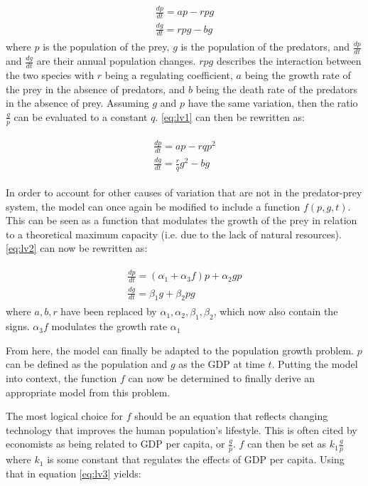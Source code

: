 \documentclass{article}
\begin{document}
\begin{align}
\begin{split}
\label{eq:lv1}
	\frac{dp}{dt} = ap - rpg \\
	\frac{dg}{dt} = rpg - bg
\end{split}
\end{align}
where $p$ is the population of the prey, $g$ is the population of the predators, and $\frac{dp}{dt}$ and $\frac{dg}{dt}$ are their annual population changes. $rpg$ describes the interaction between the two species with $r$ being a regulating coefficient, $a$ being the growth rate of the prey in the absence of predators, and $b$ being the death rate of the predators in the absence of prey. Assuming $g$ and $p$ have the same variation, then the ratio $\frac{g}{p}$ can be evaluated to a constant ${q}$. \ref{eq:lv1} can then be rewritten as:

\begin{align}
\begin{split}
\label{eq:lv2}
	\frac{dp}{dt} = ap - rqp^2\\
	\frac{dg}{dt} = \frac{r}{q}g^2- bg
\end{split}
\end{align}

In order to account for other causes of variation that are not in the predator-prey system, the model can once again be modified to include a function $f(p, g, t)$. This can be seen as a function that modulates the growth of the prey in relation to a theoretical maximum capacity (i.e. due to the lack of natural resources). \ref{eq:lv2} can now be rewritten as:

\begin{align}
\begin{split}
\label{eq:lv3}
	\frac{dp}{dt} = (\alpha_1 + \alpha_3 f)p + \alpha_2 g p \\
	\frac{dg}{dt} = \beta_1 g + \beta_2 p g
\end{split}
\end{align}
where $a, b, r$ have been replaced by $\alpha_1, \alpha_2, \beta_1, \beta_2$, which now also contain the signs. $\alpha_3f$ modulates the growth rate $\alpha_1$

From here, the model can finally be adapted to the population growth problem. $p$ can be defined as the population and $g$ as the GDP at time $t$. Putting the model into context, the function $f$ can now be determined to finally derive an appropriate model from this problem.

The most logical choice for $f$ should be an equation that reflects changing technology that improves the human population's lifestyle. This is often cited by economists as being related to GDP per capita, or $\frac{g}{p}$. $f$ can then be set as $k_1 \frac{g}{p}$ where $k_1$ is some constant that regulates the effects of GDP per capita. Using that in equation \ref{eq:lv3} yields:
\end{document}
